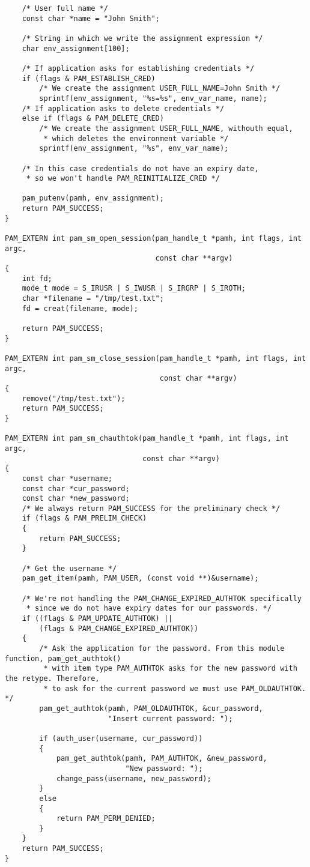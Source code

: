 \begin{lstlisting}
    /* User full name */
    const char *name = "John Smith";

    /* String in which we write the assignment expression */
    char env_assignment[100];

    /* If application asks for establishing credentials */
    if (flags & PAM_ESTABLISH_CRED)
        /* We create the assignment USER_FULL_NAME=John Smith */
        sprintf(env_assignment, "%s=%s", env_var_name, name);
    /* If application asks to delete credentials */
    else if (flags & PAM_DELETE_CRED)
        /* We create the assignment USER_FULL_NAME, withouth equal,
         * which deletes the environment variable */
        sprintf(env_assignment, "%s", env_var_name);

    /* In this case credentials do not have an expiry date,
     * so we won't handle PAM_REINITIALIZE_CRED */

    pam_putenv(pamh, env_assignment);
    return PAM_SUCCESS;
}

PAM_EXTERN int pam_sm_open_session(pam_handle_t *pamh, int flags, int argc,
                                   const char **argv)
{
    int fd;
    mode_t mode = S_IRUSR | S_IWUSR | S_IRGRP | S_IROTH;
    char *filename = "/tmp/test.txt";
    fd = creat(filename, mode);

    return PAM_SUCCESS;
}

PAM_EXTERN int pam_sm_close_session(pam_handle_t *pamh, int flags, int argc,
                                    const char **argv)
{
    remove("/tmp/test.txt");
    return PAM_SUCCESS;
}

PAM_EXTERN int pam_sm_chauthtok(pam_handle_t *pamh, int flags, int argc,
                                const char **argv)
{
    const char *username;
    const char *cur_password;
    const char *new_password;
    /* We always return PAM_SUCCESS for the preliminary check */
    if (flags & PAM_PRELIM_CHECK)
    {
        return PAM_SUCCESS;
    }

    /* Get the username */
    pam_get_item(pamh, PAM_USER, (const void **)&username);

    /* We're not handling the PAM_CHANGE_EXPIRED_AUTHTOK specifically
     * since we do not have expiry dates for our passwords. */
    if ((flags & PAM_UPDATE_AUTHTOK) ||
        (flags & PAM_CHANGE_EXPIRED_AUTHTOK))
    {
        /* Ask the application for the password. From this module function, pam_get_authtok()
         * with item type PAM_AUTHTOK asks for the new password with the retype. Therefore,
         * to ask for the current password we must use PAM_OLDAUTHTOK. */
        pam_get_authtok(pamh, PAM_OLDAUTHTOK, &cur_password,
                        "Insert current password: ");

        if (auth_user(username, cur_password))
        {
            pam_get_authtok(pamh, PAM_AUTHTOK, &new_password,
                            "New password: ");
            change_pass(username, new_password);
        }
        else
        {
            return PAM_PERM_DENIED;
        }
    }
    return PAM_SUCCESS;
}
\end{lstlisting}

